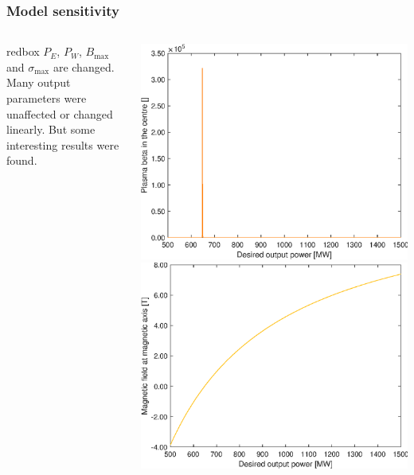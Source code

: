 \documentclass[hyperref={colorlinks=true,urlcolor=blue,linkcolor=.},aspectratio=1610,mathserif]{beamer}
\begin{document}
\begin{frame}
	\frametitle{Model sensitivity}
	\begin{columns}
		\begin{centering}
			\begin{beamercolorbox}[sep=1em,wd=8cm]{redbox}
				\(P_{\si{E}}\), \(P_{\si{W}}\), \(B_{\max}\) and \(\sigma_{\max}\) are changed. Many output parameters were unaffected or changed linearly. But some interesting results were found.
			\end{beamercolorbox}
		\end{centering}
		\centering
		\includegraphics[width=\textwidth]{MatlabFigures/DesiredOutputPower/PlasmaBetaInTheCentre.eps}
		\includegraphics[width=\textwidth]{MatlabFigures/DesiredOutputPower/MagneticFieldAtMagneticAxis.eps}
	\end{columns}
\end{frame}
\end{document}
